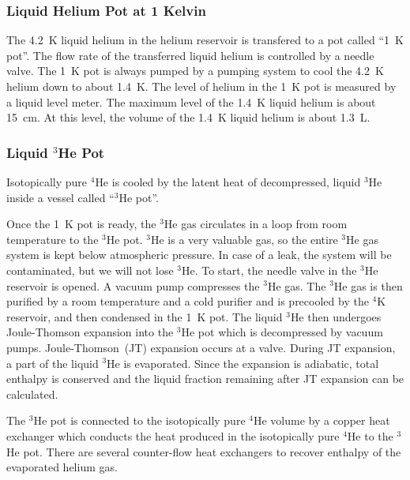 \subsubsection{Liquid Helium Pot at 1 Kelvin}
The 4.2~K liquid helium in the helium reservoir is transfered to a
pot called ``1~K pot''. The flow rate of the transferred liquid
helium is controlled by a needle valve. The 1~K pot is always pumped
by a pumping system to cool the 4.2~K helium down to about 1.4~K. The
level of helium in the 1~K pot is measured by a liquid level
meter. The maximum level of the 1.4~K liquid helium is about 15~cm. At
this level, the volume of the 1.4~K liquid helium is about 1.3~L.


\subsubsection{Liquid $^3$He Pot}

Isotopically pure $^4$He is cooled by the latent heat of decompressed,
liquid $^3$He inside a vessel called ``$^3$He pot''.


Once the 1~K pot is ready, the $^3$He gas circulates in a loop from
room temperature to the $^3$He pot. $^3$He is a very valuable gas, so
the entire $^3$He gas system is kept below atmospheric pressure. In
case of a leak, the system will be contaminated, but we will not lose
$^3$He. To start, the needle valve in the $^3$He reservoir is
opened. A vacuum pump compresses the $^3$He gas. The $^3$He gas is
then purified by a room temperature and a cold purifier and is
precooled by the $^4$K reservoir, and then condensed in the 1~K
pot. The liquid $^3$He then undergoes Joule-Thomson expansion into the
$^3$He pot which is decompressed by vacuum pumps. Joule-Thomson~(JT)
expansion occurs at a valve. During JT expansion, a part of the liquid
$^3$He is evaporated. Since the expansion is adiabatic, total enthalpy
is conserved and the liquid fraction remaining after JT expansion can
be calculated.

The $^3$He pot is connected to the isotopically pure $^4$He volume by
a copper heat exchanger which conducts the heat produced in the
isotopically pure $^4$He to the $^3$He pot. There are several
counter-flow heat exchangers to recover enthalpy of the evaporated
helium gas.



